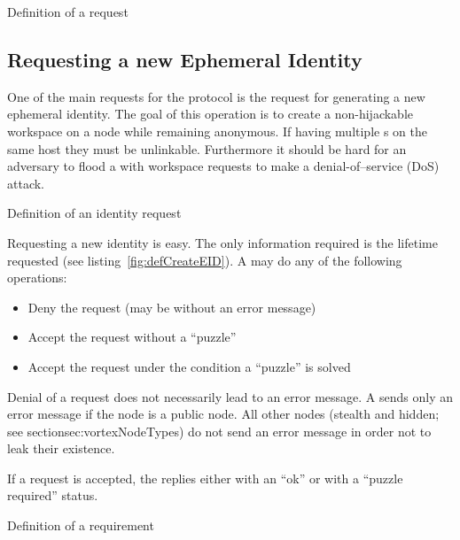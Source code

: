 \begin{lstfloat}[ht]
	
	\caption{Definition of a request}
	\label{fig:defReply}
\end{lstfloat}


\subsection{Requesting a new Ephemeral Identity\label{sec:newEID}}
One of the main requests for the protocol is the request for generating a new ephemeral identity. The goal of this operation is to create a non-hijackable workspace on a node while remaining anonymous. If having multiple s on the same host they must be unlinkable. Furthermore it should be hard for an adversary to flood a \VortexNode{} with workspace requests to make a denial-of--service (DoS) attack.

\begin{lstfloat}[ht]
	
	\caption{Definition of an identity request}
	\label{fig:defCreateEID}
\end{lstfloat}

Requesting a new identity is easy. The only information required is the lifetime requested (see listing~\ref{fig:defCreateEID}). A \VortexNode may do any of the following operations:
\begin{itemize}
	\item Deny the request (may be without an error message)
	\item Accept the request without a ``puzzle''
	\item Accept the request under the condition a ``puzzle'' is solved
\end{itemize}

Denial of a request does not necessarily lead to an error message. A \VortexNode{} sends only an error message if the node is a public node. All other nodes (stealth and hidden; see section{sec:vortexNodeTypes}) do not send an error message in order not to leak their existence.

If a request is accepted, the \VortexNode replies either with an ``ok'' or with a ``puzzle required'' status.

\begin{lstfloat}[ht]
	
	\caption{Definition of a requirement}
	\label{fig:defRequirements}
\end{lstfloat}

